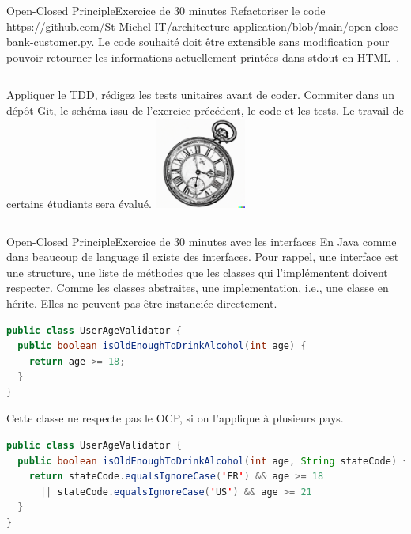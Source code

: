 \documentclass{beamer}
\begin{document}
    \begin{frame}{Open-Closed Principle}{Exercice \execcounterdispinc{} de 30 minutes}
        Refactoriser le code \url{https://github.com/St-Michel-IT/architecture-application/blob/main/open-close-bank-customer.py}.
        Le code souhaité doit être extensible sans modification pour pouvoir retourner les informations actuellement printées dans stdout en HTML~.
        \begin{columns}
            Appliquer le TDD, rédigez les tests unitaires avant de coder.
            \bigbreak
            Commiter dans un dépôt Git, le schéma issu de l'exercice précédent, le code et les tests.
            \bigbreak
            Le travail de certains étudiants sera évalué.
            \centering
            \centering
            \includegraphics[width=3cm]{image/engraving-of-an-old-watch}
        \end{columns}
    \end{frame}

    \begin{frame}[fragile]{Open-Closed Principle}{Exercice \execcounterdispinc{} de 30 minutes avec les interfaces}
        En Java comme dans beaucoup de language il existe des interfaces.
        Pour rappel, une interface est une structure, une liste de méthodes que les classes qui l'implémentent doivent respecter.
        Comme les classes abstraites, une implementation, i.e., une classe en hérite.
        Elles ne peuvent pas être instanciée directement.
        \begin{lstlisting}[language=java]
public class UserAgeValidator {
  public boolean isOldEnoughToDrinkAlcohol(int age) {
    return age >= 18;
  }
}
        \end{lstlisting}
        Cette classe ne respecte pas le OCP, si on l'applique à plusieurs pays.
        \begin{lstlisting}[language=java]
public class UserAgeValidator {
  public boolean isOldEnoughToDrinkAlcohol(int age, String stateCode) {
    return stateCode.equalsIgnoreCase('FR') && age >= 18
      || stateCode.equalsIgnoreCase('US') && age >= 21
  }
}
        \end{lstlisting}
    \end{frame}
\end{document}
